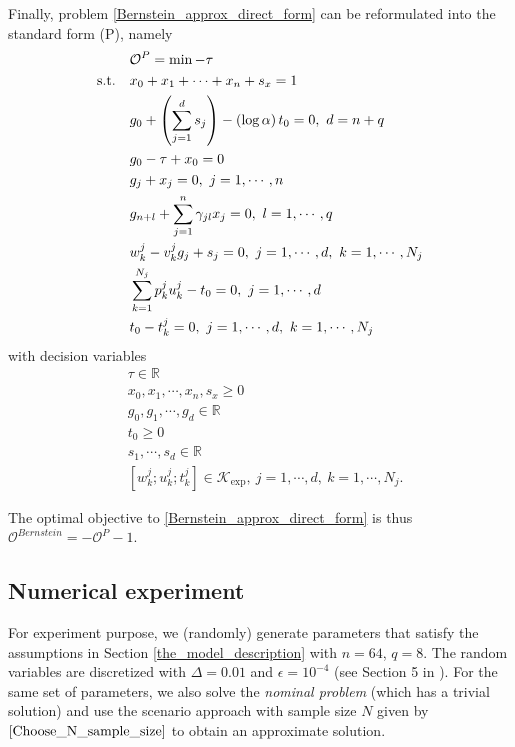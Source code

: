 \documentclass[10pt]{article}
\theoremstyle{definition}
\theoremstyle{plain}
\begin{document}
Finally, problem \eqref{Bernstein_approx_direct_form} can be reformulated into the standard form (P), namely
\begin{align}
\begin{split}\label{reformulated_std_conic_form}
& \mathcal{O}^{P} = \min  -\tau \\ 
\textnormal{s.t.}\ \ \ & x_0 + x_1 + \cdots + x_n + s_x = 1 \\
& g_0 + \left(\sum_{j=1}^d s_j\right) - \left(\log \alpha\right) t_0 = 0,\ d=n+q \\
& g_0  - \tau + x_0 = 0 \\
& g_j + x_j = 0,\ j = 1, \cdots, n \\
& g_{n+l} + \sum_{j=1}^n \gamma_{jl} x_j = 0,\ l = 1, \cdots, q \\
& w_k^j - v_k^j g_j + s_j = 0,\ j = 1, \cdots,d,\ k = 1, \cdots, N_j \\
& \sum_{k=1}^{N_j} p_k^j u_k^j - t_0 = 0,\  j =1,\cdots,d \\
& t_0 - t_k^j = 0,\ j = 1,\cdots, d,\ k = 1,\cdots,N_j
\end{split}
\end{align}
with decision variables
\begin{align*}
& \tau \in \mathbb{R} \\
& x_0, x_1, \cdots, x_n, s_x \geq 0 \\
& g_0, g_1, \cdots, g_d \in \mathbb{R} \\
& t_0 \geq 0 \\
& s_1, \cdots, s_d \in \mathbb{R} \\
& \left[w_k^j; u_k^j; t_k^j\right] \in \mathcal{K}_{\exp},\ j = 1, \cdots, d,\ k = 1,\cdots, N_j.
\end{align*}

The optimal objective to \eqref{Bernstein_approx_direct_form} is thus $\mathcal{O}^{Bernstein} = -\mathcal{O}^P -1$.

\subsection{Numerical experiment}
For experiment purpose, we (randomly) generate parameters that satisfy the assumptions in Section \ref{the_model_description} with $n=64$, $q=8$. The random variables are discretized with $\Delta=0.01$ and $\epsilon=10^{-4}$ (see Section 5 in \cite{Nemirovsky_and_Shapiro}). For the same set of parameters, we also solve the \textit{nominal problem} (which has a trivial solution) and use the scenario approach with sample size $N$ given by $\eqref{Choose_N_sample_size}$ to obtain an approximate solution.
\end{document}
